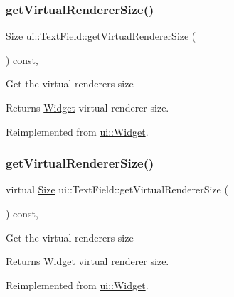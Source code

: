\subsubsection{\texorpdfstring{get\+Virtual\+Renderer\+Size()}{getVirtualRendererSize()}\hspace{0.1cm}{\footnotesize\ttfamily [1/2]}}
{\footnotesize\ttfamily \hyperlink{classSize}{Size} ui\+::\+Text\+Field\+::get\+Virtual\+Renderer\+Size (\begin{DoxyParamCaption}{ }\end{DoxyParamCaption}) const\hspace{0.3cm}{\ttfamily [override]}, {\ttfamily [virtual]}}

Get the virtual renderer\textquotesingle{}s size \begin{DoxyReturn}{Returns}
\hyperlink{classui_1_1Widget}{Widget} virtual renderer size. 
\end{DoxyReturn}


Reimplemented from \hyperlink{classui_1_1Widget_a2ed0d41565593f78dc59c975d58a869e}{ui\+::\+Widget}.

\mbox{\label{classui_1_1TextField_a1eb2eb5212ee89b2f54dad80bd9a22ca}} 
\subsubsection{\texorpdfstring{get\+Virtual\+Renderer\+Size()}{getVirtualRendererSize()}\hspace{0.1cm}{\footnotesize\ttfamily [2/2]}}
{\footnotesize\ttfamily virtual \hyperlink{classSize}{Size} ui\+::\+Text\+Field\+::get\+Virtual\+Renderer\+Size (\begin{DoxyParamCaption}{ }\end{DoxyParamCaption}) const\hspace{0.3cm}{\ttfamily [override]}, {\ttfamily [virtual]}}

Get the virtual renderer\textquotesingle{}s size \begin{DoxyReturn}{Returns}
\hyperlink{classui_1_1Widget}{Widget} virtual renderer size. 
\end{DoxyReturn}


Reimplemented from \hyperlink{classui_1_1Widget_a2ed0d41565593f78dc59c975d58a869e}{ui\+::\+Widget}.

